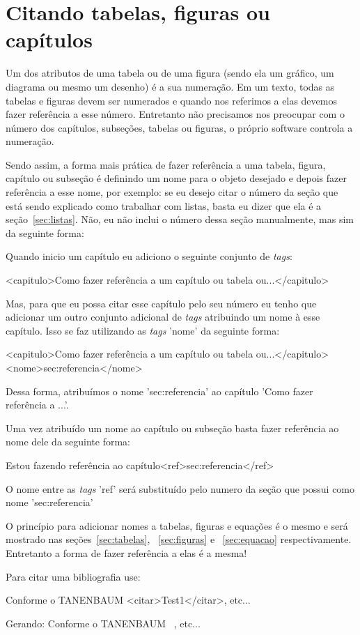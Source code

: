 \newpage \chapter{Citando tabelas, figuras ou capítulos}\setcounter{SteP}{1}
\label{sec:citando}

Um dos atributos de uma tabela ou de uma figura (sendo ela um gráfico, um
diagrama ou mesmo um desenho) é a sua numeração. Em um texto, todas as tabelas
e figuras devem ser numerados e quando nos referimos a elas devemos fazer
referência a esse número. Entretanto não precisamos nos preocupar com o
número dos capítulos, subseções, tabelas ou figuras, o próprio software
controla a numeração. 

Sendo assim, a forma mais prática de fazer referência a
uma tabela, figura, capítulo ou subseção é definindo um nome para o objeto
desejado e depois fazer referência a esse nome, por exemplo: se eu desejo citar
o número da seção que está sendo explicado como trabalhar com listas, basta eu
dizer que ela é a seção~\ref{sec:listas}. Não, eu não inclui o número dessa
seção manualmente, mas sim da seguinte forma:

Quando inicio um capítulo eu adiciono o seguinte conjunto de {\it tags}:

\begin{BoxVerbatim}
<capitulo>Como fazer referência a um capítulo ou tabela ou...</capitulo>
\end{BoxVerbatim}

Mas, para que eu possa citar esse capítulo pelo seu número eu tenho que
adicionar um outro conjunto adicional de {\it tags} atribuindo um nome à esse 
capítulo. Isso se faz utilizando as {\it tags} 'nome' da seguinte forma:

\begin{BoxVerbatim}
<capitulo>Como fazer referência a um capítulo ou tabela ou...</capitulo>
<nome>sec:referencia</nome>
\end{BoxVerbatim}

Dessa forma, atribuímos o nome 'sec:referencia' ao capítulo 'Como fazer
referência a ...'.

Uma vez atribuído um nome ao capítulo ou subseção basta fazer referência ao
nome dele da seguinte forma:

\begin{BoxVerbatim}
Estou fazendo referência ao capítulo<ref>sec:referencia</ref>
\end{BoxVerbatim}

O nome entre as {\it tags} 'ref' será substituído pelo numero da seção que
possui como nome 'sec:referencia'

O princípio para adicionar nomes a tabelas, figuras e equações é o mesmo e
será mostrado nas seções~\ref{sec:tabelas}, ~\ref{sec:figuras} e
~\ref{sec:equacao} respectivamente.  Entretanto a forma de fazer
referência a elas é a mesma!

Para citar uma bibliografia use:
\begin{BoxVerbatim}
Conforme o TANENBAUM <citar>Test1</citar>, etc...
\end{BoxVerbatim}

Gerando: Conforme o TANENBAUM ~\cite{Test1}, etc...

